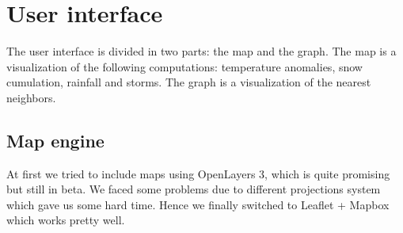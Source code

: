 \section{User interface}
The user interface is divided in two parts: the map and the graph. The map is a visualization of the following computations: temperature anomalies, snow cumulation, rainfall and storms. The graph is a visualization of the nearest neighbors.

\subsection{Map engine}
At first we tried to include maps using OpenLayers 3, which is quite promising but still in beta. We faced some problems due to different projections system which gave us some hard time. Hence we finally switched to Leaflet + Mapbox which works pretty well.

\subsection{}
